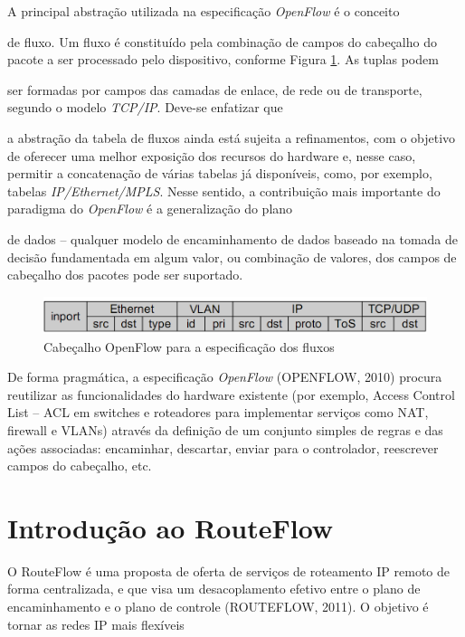 A principal abstração utilizada na 
especificação \textit{OpenFlow} é o conceito 

de fluxo. Um fluxo é
constituído pela combinação de campos do 
cabeçalho do pacote a ser processado pelo
dispositivo, conforme Figura 
\ref{fig:cabecalhoOpenflow}. As tuplas podem 

ser formadas por campos das 
camadas de
enlace, de rede ou de transporte, segundo o 
modelo \textit{TCP/IP}. Deve-se enfatizar que 

a
abstração da tabela de fluxos ainda está 
sujeita a refinamentos, com o objetivo de 
oferecer uma
melhor exposição dos recursos do hardware e, 
nesse caso, permitir a concatenação de 
várias
tabelas já disponíveis, como, por exemplo, 
tabelas \textit{IP/Ethernet/MPLS}. Nesse 
sentido, a
contribuição mais importante do paradigma do 
\textit{OpenFlow} é a generalização do plano 

de dados –
qualquer modelo de encaminhamento de dados 
baseado na tomada de decisão fundamentada
em algum valor, ou combinação de valores, dos 
campos de cabeçalho dos pacotes pode ser
suportado. 

\begin{figure}[hb]
\centering
\includegraphics[width=160mm]{cabecalhoOpenflow.png}
\caption{Cabeçalho OpenFlow para a 
especificação dos fluxos}
\label{fig:cabecalhoOpenflow}
\end{figure}

De forma pragmática, a especificação 
\textit{OpenFlow} (OPENFLOW, 2010) procura 
reutilizar as
funcionalidades do hardware existente (por 
exemplo, Access Control List – ACL em 
switches
e roteadores para implementar serviços como 
NAT, firewall e VLANs) através da definição 
de
um conjunto simples de regras e das ações 
associadas: encaminhar, descartar, enviar 
para 
o
controlador, reescrever campos do cabeçalho, 
etc. 

\section{Introdução ao RouteFlow}

O RouteFlow é uma proposta de oferta de 
serviços de roteamento IP remoto de forma
centralizada, e que visa um desacoplamento 
efetivo entre o plano de encaminhamento e o
plano de controle (ROUTEFLOW, 2011). O 
objetivo é tornar as redes IP mais flexíveis 

